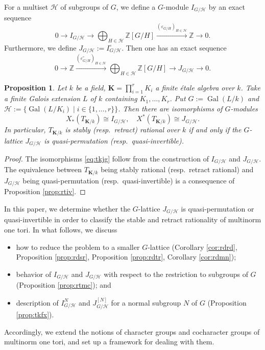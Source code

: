 \documentclass[12pt]{amsart}
\theoremstyle{plain}
\newtheorem{prop}[thm]{Proposition}
\theoremstyle{definition}
\numberwithin{thm}{section}
\numberwithin{equation}{section}
\newcommand{\Z}{\mathbb{Z}}
\newcommand{\bK}{\mathbf{K}}
\newcommand{\cH}{\mathcal{H}}
\DeclareMathOperator{\Gal}{Gal}
\begin{document}
For a multiset $\cH$ of subgroups of $G$, we define a $G$-module $I_{G/\cH}$ by an exact sequence
\begin{equation*}
    0\rightarrow I_{G/\cH}\rightarrow \bigoplus_{H\in \cH}\Z[G/H]\xrightarrow{(\varepsilon_{G/H})_{H\in \cH}} \Z \rightarrow 0. 
\end{equation*}
Furthermore, we define $J_{G/\cH}:=I_{G/\cH}^{\circ}$. Then one has an exact sequence
\begin{equation*}
    0\rightarrow \Z \xrightarrow{(\varepsilon_{G/H}^{\circ})_{H\in \cH}} \bigoplus_{H\in \cH}\Z[G/H] \rightarrow J_{G/\cH} \rightarrow 0. 
\end{equation*}

\begin{prop}\label{prop:coch}
Let $k$ be a field, $\bK=\prod_{i=1}^{r}K_{i}$ a finite {\'e}tale algebra over $k$. Take a finite Galois extension $L$ of $k$ containing $K_{1},\ldots,K_{r}$. Put $G:=\Gal(L/k)$ and $\cH:=\{\Gal(L/K_{i})\mid i\in \{1,\ldots,r\}\}$. Then there are isomorphisms of $G$-modules
\begin{equation}\label{eq:tkjg}
    X_{*}(T_{\bK/k})\cong I_{G/\cH},\quad X^{*}(T_{\bK/k})\cong J_{G/\cH}. 
\end{equation}
In particular, $T_{\bK/k}$ is stably (resp.~retract) rational over $k$ if and only if the $G$-lattice $J_{G/\cH}$ is quasi-permutation (resp.~quasi-invertible). 
\end{prop}

\begin{proof}
The isomorphisms \eqref{eq:tkjg} follow from the construction of $I_{G/\cH}$ and $J_{G/\cH}$. The equivalence between $T_{\bK/k}$ being stably rational (resp.~retract rational) and $J_{G/\cH}$ being quasi-permutation (resp.~quasi-invertible) is a consequence of Proposition \ref{prop:rtiv}. 
\end{proof}

In this paper, we determine whether the $G$-lattice $J_{G/\cH}$ is quasi-permutation or quasi-invertible in order to classify the stable and retract rationality of multinorm one tori. 
In what follows, we discuss
\begin{itemize}
\item how to reduce the problem to a smaller $G$-lattice (Corollary \ref{cor:rdrd}, Proposition \ref{prop:rdsr},
Proposition \ref{prop:rdtr}, Corollary \ref{cor:rdmn}); 
\item behavior of $I_{G/\cH}$ and $J_{G/\cH}$ with respect to the restriction to subgroups of $G$ (Proposition \ref{prop:rtmc}); and
\item description of $I_{G/\cH}^{N}$ and $J_{G/\cH}^{[N]}$ for a normal subgroup $N$ of $G$ (Proposition \ref{prop:tkfx}). 
\end{itemize}
Accordingly, we extend the notions of character groups and cocharacter groups of multinorm one tori, and set up a framework for dealing with them.
\end{document}

